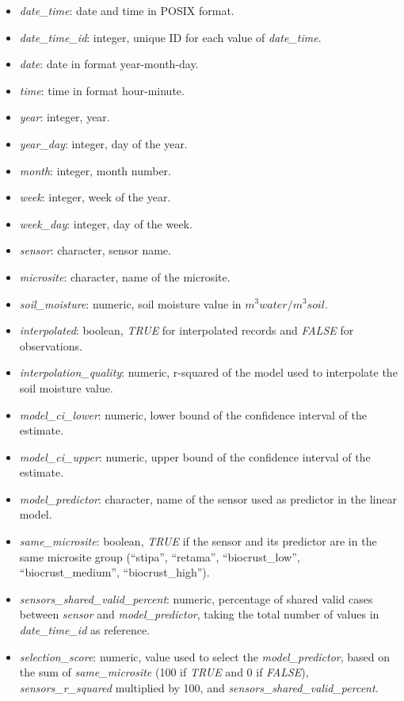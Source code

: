 \documentclass[
  table]{article}
\providecommand{\tightlist}{%
  \setlength{\itemsep}{0pt}\setlength{\parskip}{0pt}}
\begin{document}
\begin{itemize}
\tightlist
\item
  \emph{date\_time}: date and time in POSIX format.
\item
  \emph{date\_time\_id}: integer, unique ID for each value of
  \emph{date\_time}.
\item
  \emph{date}: date in format year-month-day.
\item
  \emph{time}: time in format hour-minute.
\item
  \emph{year}: integer, year.
\item
  \emph{year\_day}: integer, day of the year.
\item
  \emph{month}: integer, month number.
\item
  \emph{week}: integer, week of the year.
\item
  \emph{week\_day}: integer, day of the week.
\item
  \emph{sensor}: character, sensor name.
\item
  \emph{microsite}: character, name of the microsite.
\item
  \emph{soil\_moisture}: numeric, soil moisture value in
  \(m^{3} water /m^{3} soil\).
\item
  \emph{interpolated}: boolean, \emph{TRUE} for interpolated records and
  \emph{FALSE} for observations.
\item
  \emph{interpolation\_quality}: numeric, r-squared of the model used to
  interpolate the soil moisture value.
\item
  \emph{model\_ci\_lower}: numeric, lower bound of the confidence
  interval of the estimate.
\item
  \emph{model\_ci\_upper}: numeric, upper bound of the confidence
  interval of the estimate.
\item
  \emph{model\_predictor}: character, name of the sensor used as
  predictor in the linear model.
\item
  \emph{same\_microsite}: boolean, \emph{TRUE} if the sensor and its
  predictor are in the same microsite group (``stipa'', ``retama'',
  ``biocrust\_low'', ``biocrust\_medium'', ``biocrust\_high'').
\item
  \emph{sensors\_shared\_valid\_percent}: numeric, percentage of shared
  valid cases between \emph{sensor} and \emph{model\_predictor}, taking
  the total number of values in \emph{date\_time\_id} as reference.
\item
  \emph{selection\_score}: numeric, value used to select the
  \emph{model\_predictor}, based on the sum of \emph{same\_microsite}
  (100 if \emph{TRUE} and 0 if \emph{FALSE}), \emph{sensors\_r\_squared}
  multiplied by 100, and \emph{sensors\_shared\_valid\_percent}.
\end{itemize}
\end{document}
